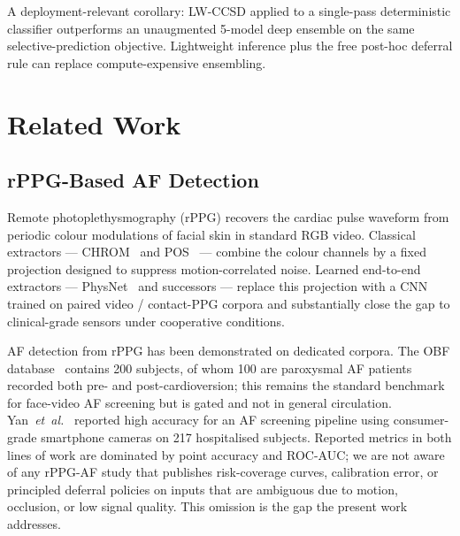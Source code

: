 \documentclass[journal]{IEEEtran}
\begin{document}
A deployment-relevant corollary: LW-CCSD applied to a single-pass deterministic classifier outperforms an unaugmented 5-model deep ensemble on the same selective-prediction objective. Lightweight inference plus the free post-hoc deferral rule can replace compute-expensive ensembling.

\section{Related Work}
\subsection{rPPG-Based AF Detection}
Remote photoplethysmography (rPPG) recovers the cardiac pulse waveform from periodic colour modulations of facial skin in standard RGB video. Classical extractors --- CHROM~\cite{dehaan2013chrom} and POS~\cite{wang2017pos} --- combine the colour channels by a fixed projection designed to suppress motion-correlated noise. Learned end-to-end extractors --- PhysNet~\cite{yu2019physnet} and successors --- replace this projection with a CNN trained on paired video / contact-PPG corpora and substantially close the gap to clinical-grade sensors under cooperative conditions.

AF detection from rPPG has been demonstrated on dedicated corpora. The OBF database~\cite{li2018obf} contains 200 subjects, of whom 100 are paroxysmal AF patients recorded both pre- and post-cardioversion; this remains the standard benchmark for face-video AF screening but is gated and not in general circulation. Yan~\emph{et~al.}~\cite{yan2022consumer} reported high accuracy for an AF screening pipeline using consumer-grade smartphone cameras on 217 hospitalised subjects. Reported metrics in both lines of work are dominated by point accuracy and ROC-AUC; we are not aware of any rPPG-AF study that publishes risk-coverage curves, calibration error, or principled deferral policies on inputs that are ambiguous due to motion, occlusion, or low signal quality. This omission is the gap the present work addresses.
\end{document}
